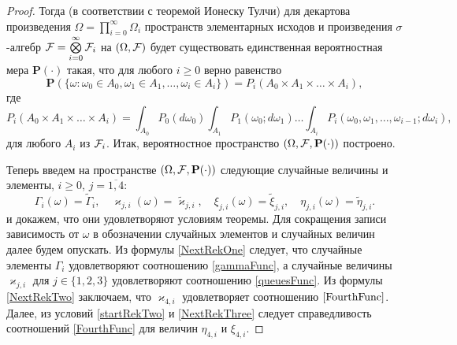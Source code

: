 \documentclass[12pt]{extarticle}
\theoremstyle{theorem}
\theoremstyle{remark}
\renewcommand{\Pr}{{\mathbf P}}
\begin{document}
\begin{proof}
Тогда (в соответствии с теоремой Ионеску Тулчи) для декартова произведения $\Omega=\prod\limits_{i=0}^{\infty}\Omega_i$ пространств элементарных исходов и произведения $\sigma$-алгебр ${\cal F}=\bigotimes\limits_{i=0}^{\infty} {\cal F}_i$ на $(\Omega,{\cal F})$ будет существовать единственная вероятностная мера $\Pr(\cdot)$ такая, что для любого $i \geqslant 0$ верно равенство
\begin{equation}
\Pr(\{\omega \colon \omega_0 \in A_0, \omega_1 \in A_1, \ldots, \omega_i\in A_i\})= P_i(A_0 \times A_1 \times \ldots \times A_i),
\label{ProbabilitiesGeneral}
\end{equation}
где 
\begin{equation}
 P_i(A_0 \times A_1 \times \ldots \times A_i) = \int_{A_0} P_0(d \omega_0) \int_{A_1} P_1(\omega_0;d \omega_1) \ldots \int_{A_i} P_i(\omega_0, \omega_1, \ldots, \omega_{i-1}; d \omega_i),
\label{ProbabilitiesGeneralOne}
\end{equation}
для любого $A_i$ из ${\cal F}_i$. Итак, вероятностное пространство $(\Omega,{\cal F},\Pr(\cdot))$ построено. 

Теперь введем на пространстве $(\Omega,{\cal F},\Pr(\cdot))$ следующие случайные величины и элементы, $i \geqslant 0$, $j =\overline{1,4}$:
\begin{equation*}
    \Gamma_i(\omega) = \tilde{\Gamma}_i, \quad \varkappa_{j,i}(\omega) = \tilde{\varkappa}_{j,i},\quad
    \xi_{j,i}(\omega) = \tilde{\xi}_{j,i}, \quad \eta_{j,i}(\omega) = \tilde{\eta}_{j,i}.
\end{equation*}
и докажем, что они  удовлетворяют условиям теоремы. Для сокращения записи зависимость от $\omega$ в обозначении случайных элементов и случайных величин далее будем опускать. Из формулы \eqref{NextRekOne} следует, что случайные элементы $\Gamma_i$ удовлетворяют соотношению \eqref{gammaFunc}, а случайные величины $\varkappa_{j,i}$ для $j\in \{1, 2, 3\}$ удовлетворяют соотношению \eqref{queuesFunc}. Из формулы \eqref{NextRekTwo} заключаем, что $\varkappa_{4,i}$ удовлетворяет соотношению $\eqref{FourthFunc}$. Далее, из условий \eqref{startRekTwo} и \eqref{NextRekThree} следует справедливость соотношений \eqref{FourthFunc} для величин $\eta_{4,i}$ и $\xi_{4,i}$. 


\end{proof}
\end{document}
